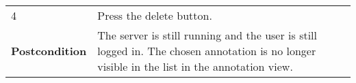 \begin{longtable}[c]{@{}ll@{}}
\begin{minipage}[t]{0.31\columnwidth}\raggedright\strut
4
\strut\end{minipage} &
\begin{minipage}[t]{0.63\columnwidth}\raggedright\strut
Press the delete button.
\strut\end{minipage}\tabularnewline
\begin{minipage}[t]{0.31\columnwidth}\raggedright\strut
\textbf{Postcondition}
\strut\end{minipage} &
\begin{minipage}[t]{0.63\columnwidth}\raggedright\strut
The server is still running and the user is still logged in. The chosen
annotation is no longer visible in the list in the annotation view.
\strut\end{minipage}\tabularnewline
\bottomrule
\end{longtable}

